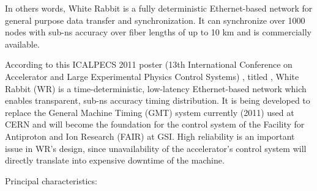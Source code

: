 \vspace{5 mm}

\noindent In others words, White Rabbit \cite{WR:ohwr} is a fully deterministic Ethernet-based network for general purpose data transfer and synchronization. 
It can synchronize over 1000 nodes with sub-ns accuracy over fiber lengths of up to 10 km and is commercially available.

\vspace{5 mm}

\noindent According to this ICALPECS 2011 poster (13th International Conference on Accelerator and Large Experimental Physics Control Systems) \cite{white-rabbit:poster}, titled , White Rabbit (WR) is a time-deterministic, low-latency Ethernet-based network which enables transparent, sub-ns accuracy timing distribution. 
It is being developed to replace the General Machine Timing (GMT) system currently (2011) used at CERN and will become the foundation for the control system of the Facility for Antiproton and Ion Research (FAIR) at GSI.
High reliability is an important issue in WR’s design, since unavailability of the accelerator’s control system will directly translate into expensive downtime of the machine.

\vspace{5 mm}

\noindent Principal characteristics:

